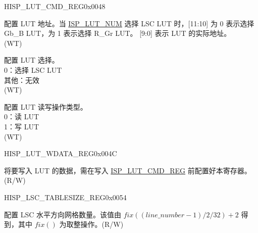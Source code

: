 \begin{register}{H}{ISP\_LUT\_CMD\_REG}{0x0048}\label{regdesc:ISPLUTCMDREG}
%
%
%
%
\regnewline%
\begin{regdesc}\begin{reglist}
\label{fielddesc:ISPLUTADDR}\item [ISP\_LUT\_ADDR] 配置 LUT 地址。当 \hyperref[fielddesc:ISPLUTNUM]{ISP\_LUT\_NUM} 选择 LSC LUT 时，[11:10] 为 0 表示选择 Gb\_B LUT，为 1 表示选择 R\_Gr LUT。 [9:0] 表示 LUT 的实际地址。\\(WT)
\label{fielddesc:ISPLUTNUM}\item [ISP\_LUT\_NUM] 配置 LUT 选择。\\
0：选择 LSC LUT\\其他：无效\\(WT)
\label{fielddesc:ISPLUTCMD}\item [ISP\_LUT\_CMD] 配置 LUT 读写操作类型。\\0：读 LUT\\1：写 LUT\\(WT)
\end{reglist}\end{regdesc}
\end{register}


\begin{register}{H}{ISP\_LUT\_WDATA\_REG}{0x004C}\label{regdesc:ISPLUTWDATAREG}
%
\regnewline%
\begin{regdesc}\begin{reglist}
\label{fielddesc:ISPLUTWDATA}\item [ISP\_LUT\_WDATA] 将要写入 LUT 的数据，需在写入 \hyperref[regdesc:ISPLUTCMDREG]{ISP\_LUT\_CMD\_REG} 前配置好本寄存器。(R/W)
\end{reglist}\end{regdesc}
\end{register}


\begin{register}{H}{ISP\_LSC\_TABLESIZE\_REG}{0x0054}\label{regdesc:ISPLSCTABLESIZEREG}
%
%
\regnewline%
\begin{regdesc}\begin{reglist}
\label{fielddesc:ISPLSCXTABLESIZE}\item [ISP\_LSC\_XTABLESIZE] 配置 LSC 水平方向网格数量。该值由 $fix((line\_number -1)/2/32) + 2$ 得到，其中 $fix()$ 为取整操作。(R/W)
\end{reglist}\end{regdesc}
\end{register}


